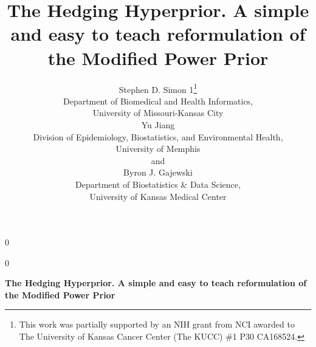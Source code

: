 \documentclass[12pt]{article}
\newcommand{\blind}{0}
\begin{document}
%

\def\spacingset#1{\renewcommand{\baselinestretch}%
{#1}\small\normalsize} \spacingset{1}



\blind
{
  \title{\bf The Hedging Hyperprior. A simple and easy to teach reformulation of the Modified Power Prior}
  \author{Stephen D. Simon 1\thanks{
    This work was partially supported by an NIH grant from NCI awarded to The University of Kansas Cancer Center (The KUCC) \#1 P30 CA168524.}\hspace{.2cm}\\
    Department of Biomedical and Health Informatics,\\University of Missouri-Kansas City\\
    Yu Jiang\\
    Division of Epidemiology, Biostatistics, and Environmental Health,\\University of Memphis\\
    and \\
    Byron J. Gajewski\\
    Department of Biostatistics \& Data Science,\\University of Kansas Medical Center}
  \maketitle
} \fi

\blind
{
  \bigskip
  \bigskip
  \bigskip
  \begin{center}
    {\LARGE\bf The Hedging Hyperprior. A simple and easy to teach reformulation of the Modified Power Prior}
\end{center}
  \medskip
} \fi
\end{document}
